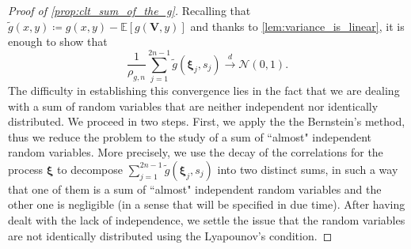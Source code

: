 \documentclass[11pt,a4paper,oneside]{article}
\theoremstyle{definition}
\theoremstyle{remark}
\def\E{\mathbb{E}}
\begin{document}
\begin{proof}[Proof of \cref{prop:clt_sum_of_the_g}]
	Recalling that $\tilde g (x,y) \coloneqq g(x,y) - \E \left[ g\left( \bm V, y\right) \right]$ and thanks to  \cref{lem:variance_is_linear}, it is enough to show that 
	\begin{equation}\label{eq:clt_h}
		\frac{1}{\rho_{g,n}}	\sum_{j=1}^{2n-1}\tilde{g}\left(\bm \xi_j,s_j\right)\xrightarrow{d} \bm{\mathcal{N}}(0, 1).
	\end{equation}
	The difficulty in establishing this convergence lies in the fact that we are dealing with a sum of random variables that are neither independent nor identically distributed. 
	We proceed in two steps. First, we apply the the Bernstein's method, thus we reduce the problem to the study of a sum of ``almost" independent random variables. More precisely, we use the decay of the correlations for the process $\bm \xi$ to decompose $\sum_{j=1}^{2n-1}\tilde{g}\left(\bm \xi_j,s_j\right)$ into two distinct sums, in such a way that one of them is a sum of ``almost" independent random variables and the other one is negligible (in a sense that will be specified in due time). After having dealt with the lack of independence, we settle the issue that the random variables are not identically distributed using the Lyapounov's condition.
	

\end{proof}
\end{document}
